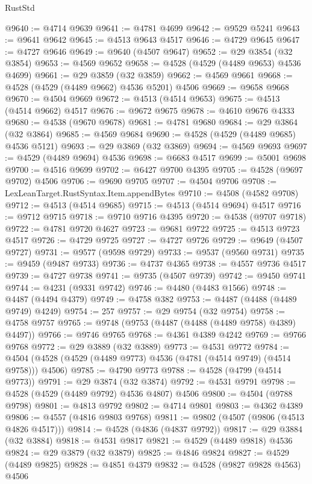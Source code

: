 \begin{lexlean}{RustStd}
\begin{coremodule}
@9640 := @4714 @9639
@9641 := @4781 @4699
@9642 := @9529 @5241
@9643 := @9641 @9642
@9645 := @4513 @9643 @4517
@9646 := @4729 @9645
@9647 := @4727 @9646
@9649 := @9640 (@4507 @9647)
@9652 := @29 @3854 (@32 @3854)
@9653 := @4569 @9652
@9658 := @4528 (@4529 (@4489 @9653) @4536 @4699)
@9661 := @29 @3859 (@32 @3859)
@9662 := @4569 @9661
@9668 := @4528 (@4529 (@4489 @9662) @4536 @5201) @4506
@9669 := @9658 @9668
@9670 := @4504 @9669
@9672 := @4513 (@4514 @9653)
@9675 := @4513 (@4514 @9662) @4517
@9676 := @9672 @9675
@9678 := @4610 @9676 @4333
@9680 := @4538 (@9670 @9678)
@9681 := @4781 @9680
@9684 := @29 @3864 (@32 @3864)
@9685 := @4569 @9684
@9690 := @4528 (@4529 (@4489 @9685) @4536 @5121)
@9693 := @29 @3869 (@32 @3869)
@9694 := @4569 @9693
@9697 := @4529 (@4489 @9694) @4536
@9698 := @6683 @4517
@9699 := @5001 @9698
@9700 := @4516 @9699
@9702 := @6427 @9700 @4395
@9705 := @4528 (@9697 @9702) @4506
@9706 := @9690 @9705
@9707 := @4504 @9706
@9708 := LexLeanTarget.RustSyntax.Item.appendBytes
@9710 := @4508 (@4582 @9708)
@9712 := @4513 (@4514 @9685)
@9715 := @4513 (@4514 @9694) @4517
@9716 := @9712 @9715
@9718 := @9710 @9716 @4395
@9720 := @4538 (@9707 @9718)
@9722 := @4781 @9720 @4627
@9723 := @9681 @9722
@9725 := @4513 @9723 @4517
@9726 := @4729 @9725
@9727 := @4727 @9726
@9729 := @9649 (@4507 @9727)
@9731 := @9577 (@9598 @9729)
@9733 := @9537 (@9560 @9731)
@9735 := @9459 (@9487 @9733)
@9736 := @4737 @4365
@9738 := @4557 @9736 @4517
@9739 := @4727 @9738
@9741 := @9735 (@4507 @9739)
@9742 := @9450 @9741
@9744 := @4231 (@9331 @9742)
@9746 := @4480 (@4483 @1566)
@9748 := @4487 (@4494 @4379)
@9749 := @4758 @382
@9753 := @4487 (@4488 (@4489 @9749) @4249)
@9754 := 257
@9757 := @29 @9754 (@32 @9754)
@9758 := @4758 @9757
@9765 := @9748 (@9753 (@4487 (@4488 (@4489 @9758) @4389) @4497))
@9766 := @9746 @9765
@9768 := @4361 @4389 @4242
@9769 := @9766 @9768
@9772 := @29 @3889 (@32 @3889)
@9773 := @4531 @9772
@9784 := @4504 (@4528 (@4529 (@4489 @9773) @4536 (@4781 (@4514 @9749) (@4514 @9758))) @4506)
@9785 := @4790 @9773
@9788 := @4528 (@4799 (@4514 @9773))
@9791 := @29 @3874 (@32 @3874)
@9792 := @4531 @9791
@9798 := @4528 (@4529 (@4489 @9792) @4536 @4807) @4506
@9800 := @4504 (@9788 @9798)
@9801 := @4813 @9792
@9802 := @4714 @9801
@9803 := @4362 @4389
@9806 := @4557 (@4816 @9803 @9768)
@9811 := @9802 (@4507 (@9806 (@4513 @4826 @4517)))
@9814 := @4528 (@4836 (@4837 @9792))
@9817 := @29 @3884 (@32 @3884)
@9818 := @4531 @9817
@9821 := @4529 (@4489 @9818) @4536
@9824 := @29 @3879 (@32 @3879)
@9825 := @4846 @9824
@9827 := @4529 (@4489 @9825)
@9828 := @4851 @4379
@9832 := @4528 (@9827 @9828 @4563) @4506

\end{coremodule}
\end{lexlean}
